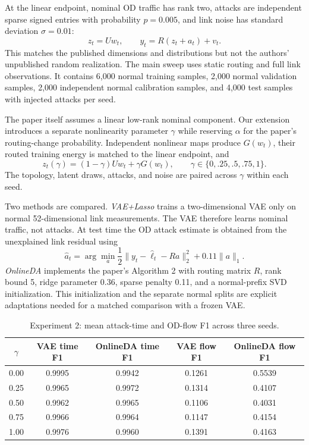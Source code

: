\documentclass[12pt]{article}
\begin{document}
At the linear endpoint, nominal OD traffic has rank two, attacks are independent
sparse signed entries with probability $p=0.005$, and link noise has standard
deviation $\sigma=0.01$:
\[
z_t=Uw_t,\qquad
y_t=R(z_t+a_t)+v_t.
\]
This matches the published dimensions and distributions but not the authors'
unpublished random realization.  The main sweep uses static routing and full
link observations.  It contains 6,000 normal training samples, 2,000 normal
validation samples, 2,000 independent normal calibration samples, and 4,000
test samples with injected attacks per seed.

The paper itself assumes a linear low-rank nominal component.  Our extension
introduces a separate nonlinearity parameter $\gamma$ while reserving $\alpha$
for the paper's routing-change probability.  Independent nonlinear maps produce
$G(w_t)$, their routed training energy is matched to the linear endpoint, and
\[
z_t(\gamma)=(1-\gamma)Uw_t+\gamma G(w_t),
\qquad \gamma\in\{0,.25,.5,.75,1\}.
\]
The topology, latent draws, attacks, and noise are paired across $\gamma$ within
each seed.

Two methods are compared.  \textit{VAE+Lasso} trains a two-dimensional VAE only
on normal 52-dimensional link measurements.  The VAE therefore learns nominal
traffic, not attacks.  At test time the OD attack estimate is obtained from the
unexplained link residual using
\[
\hat a_t=\arg\min_a\frac12\|y_t-\hat \ell_t-Ra\|_2^2
                   +0.11\|a\|_1.
\]
\textit{OnlineDA} implements the paper's Algorithm 2 with routing matrix $R$,
rank bound 5, ridge parameter 0.36, sparse penalty 0.11, and a normal-prefix SVD
initialization.  This initialization and the separate normal splits are explicit
adaptations needed for a matched comparison with a frozen VAE.

\begin{table}[H]
\centering
\caption{Experiment 2: mean attack-time and OD-flow F1 across three seeds.}
\begin{tabular}{ccccc}
\toprule
$\gamma$ & VAE time F1 & OnlineDA time F1 & VAE flow F1 & OnlineDA flow F1 \\
\midrule
0.00 & 0.9995 & 0.9942 & 0.1261 & 0.5539 \\
0.25 & 0.9965 & 0.9972 & 0.1314 & 0.4107 \\
0.50 & 0.9962 & 0.9965 & 0.1106 & 0.4031 \\
0.75 & 0.9966 & 0.9964 & 0.1147 & 0.4154 \\
1.00 & 0.9976 & 0.9960 & 0.1391 & 0.4163 \\
\bottomrule
\end{tabular}
\end{table}
\end{document}
